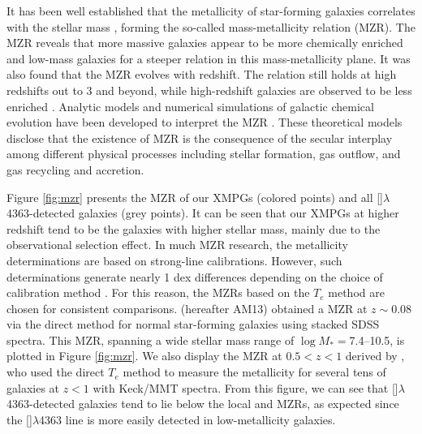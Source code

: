 \documentclass[twocolumn]{aastex631}
\newcommand{\OIIIFOT}{[\mbox{\ion{O}{3}}]$\lambda$4363}
\begin{document}
It has been well established that the metallicity of star-forming galaxies correlates with the stellar mass \citep{Tre04}, forming the so-called mass-metallicity relation (MZR). The MZR reveals that more massive galaxies appear to be more chemically enriched and low-mass galaxies for a steeper relation in this mass-metallicity plane. It was also found that the MZR evolves with redshift. The relation still holds at high redshifts out to 3 and beyond, while high-redshift galaxies are observed to be less enriched \citep{Erb06,Mai08,Mou11,Zah13,LyC16}. Analytic models and numerical simulations of galactic chemical evolution have been developed to interpret the MZR \citep{Dav11,Lil13,Tor18}. These theoretical models disclose that the existence of MZR is the consequence of the secular interplay among different physical processes including stellar formation, gas outflow, and gas recycling and accretion. 

Figure \ref{fig:mzr} presents the MZR of our XMPGs (colored points) and all \OIIIFOT-detected galaxies (grey points). It can be seen that our XMPGs at higher redshift tend to be the galaxies with higher stellar mass, mainly due to the observational selection effect. In much MZR research, the metallicity determinations are based on strong-line calibrations. However, such determinations generate nearly 1 dex differences depending on the choice of calibration method \citep{Kew08,Mou10}. For this reason, the MZRs based on the $T_e$ method are chosen for consistent comparisons. \citet{And13} (hereafter AM13) obtained a MZR at $z\sim0.08$ via the direct method for normal star-forming galaxies using stacked SDSS spectra. This MZR, spanning a wide stellar mass range of $\log{M_*} =$7.4--10.5, is plotted in Figure \ref{fig:mzr}. We also display the MZR at $0.5<z<1$ derived by \citet{LyC16}, who used the direct $T_e$ method to measure the metallicity for several tens of galaxies at $z < 1$ with Keck/MMT spectra. From this figure, we can see that \OIIIFOT-detected galaxies tend to lie below the local and \citet{LyC16} MZRs, as expected since the {\OIIIFOT} line is more easily detected in low-metallicity galaxies.
\end{document}
